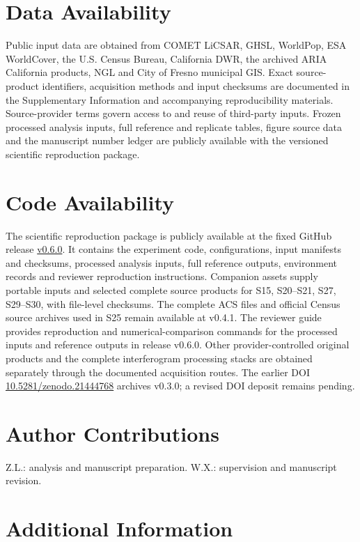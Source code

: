 \documentclass[pdflatex,sn-nature]{sn-jnl}
\begin{document}
\section*{Data Availability}
Public input data are obtained from COMET LiCSAR, GHSL, WorldPop, ESA WorldCover, the U.S. Census Bureau, California DWR, the archived ARIA California products, NGL and City of Fresno municipal GIS. Exact source-product identifiers, acquisition methods and input checksums are documented in the Supplementary Information and accompanying reproducibility materials. Source-provider terms govern access to and reuse of third-party inputs. Frozen processed analysis inputs, full reference and replicate tables, figure source data and the manuscript number ledger are publicly available with the versioned scientific reproduction package.

\section*{Code Availability}
The scientific reproduction package is publicly available at the fixed GitHub release \href{https://github.com/niubisile-wq/openinsar-observability-bias/releases/tag/v0.6.0}{v0.6.0}. It contains the experiment code, configurations, input manifests and checksums, processed analysis inputs, full reference outputs, environment records and reviewer reproduction instructions. Companion assets supply portable inputs and selected complete source products for S15, S20--S21, S27, S29--S30, with file-level checksums. The complete ACS files and official Census source archives used in S25 remain available at v0.4.1. The reviewer guide provides reproduction and numerical-comparison commands for the processed inputs and reference outputs in release v0.6.0. Other provider-controlled original products and the complete interferogram processing stacks are obtained separately through the documented acquisition routes. The earlier DOI \href{https://doi.org/10.5281/zenodo.21444768}{10.5281/zenodo.21444768} archives v0.3.0; a revised DOI deposit remains pending.
\def\bibfont{\small}

\section*{Author Contributions}
Z.L.: analysis and manuscript preparation. W.X.: supervision and manuscript revision.
\section*{Additional Information}
\end{document}
